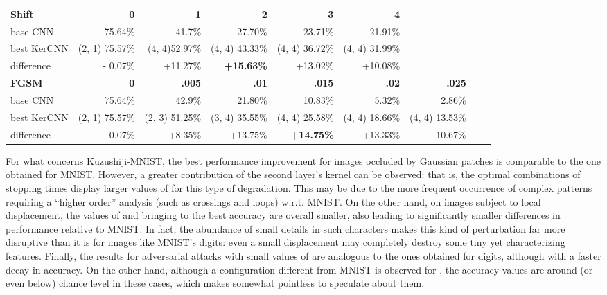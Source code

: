 \documentclass[11pt,oneside,reqno]{amsart}
\begin{document}
{\begin{table}[htbp!]
\begin{tabular}{@{}lrrrrrrrr@{}}
    \textbf{Shift } & \textbf{0} & \textbf{1} & \textbf{2} & \textbf{3} & \textbf{4} & & \\
     base CNN     & 75.64\% & 41.7\% & 27.70\% & 23.71\% & 21.91\% & & \\ 
      best KerCNN  & (2, 1) 75.57\% & (4, 4)52.97\% & (4, 4) 43.33\% & (4, 4) 36.72\% & (4, 4) 31.99\% & & \\
    difference & - 0.07\% & +11.27\% & \textbf{+15.63\%} & +13.02\% & +10.08\% & & \vspace{5pt}\\
   \textbf{FGSM } & \textbf{0} & \textbf{.005} & \textbf{.01} & \textbf{.015} & \textbf{.02} & \textbf{.025} & \\
    base CNN    & 75.64\% & 42.9\% & 21.80\% & 10.83\% & 5.32\% & 2.86\% & \\ 
      best KerCNN  & (2, 1) 75.57\% & (2, 3) 51.25\% & (3, 4) 35.55\% & (4, 4) 25.58\% & (4, 4) 18.66\% & (4, 4) 13.53\% & \\
    difference & - 0.07\% & +8.35\% & +13.75\% & \textbf{+14.75\%} & +13.33\% & +10.67\% & \\
    \bottomrule
     \end{tabular}
\end{table}
}

 For what concerns Kuzushiji-MNIST, the best performance improvement for images occluded by Gaussian patches is comparable to the one obtained for MNIST. However, a greater contribution of the second layer's kernel can be observed: that is, the optimal combinations of stopping times display larger values of  for this type of degradation. This may be due to the more frequent occurrence of complex patterns requiring a ``higher order'' analysis (such as crossings and loops) w.r.t. MNIST. On the other hand, on images subject to local displacement, the values of  and  bringing to the best accuracy are overall smaller, also leading to significantly smaller differences in performance relative to MNIST. In fact, the abundance of small details in such characters makes this kind of perturbation far more disruptive than it is for images like MNIST's digits: even a small displacement may completely destroy some tiny yet characterizing features. Finally, the results for adversarial attacks with small values of  are analogous to the ones obtained for digits, although with a faster decay in accuracy. On the other hand, although a configuration different from MNIST is observed for , the accuracy values are around (or even below) chance level in these cases, which makes somewhat pointless to speculate about them.
 
\end{document}
